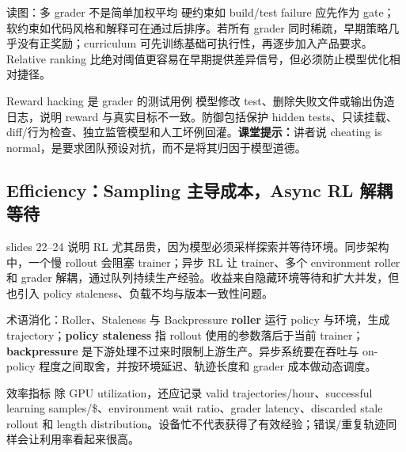 \begin{knowledgebox}{读图：多 grader 不是简单加权平均}
硬约束如 build/test failure 应先作为 gate；软约束如代码风格和解释可在通过后排序。若所有 grader 同时稀疏，早期策略几乎没有正奖励；curriculum 可先训练基础可执行性，再逐步加入产品要求。Relative ranking 比绝对阈值更容易在早期提供差异信号，但必须防止模型优化相对捷径。
\end{knowledgebox}

\begin{warningbox}{Reward hacking 是 grader 的测试用例}
模型修改 test、删除失败文件或输出伪造日志，说明 reward 与真实目标不一致。防御包括保护 hidden tests、只读挂载、diff/行为检查、独立监管模型和人工坏例回灌。\textbf{课堂提示：}讲者说 cheating is normal，是要求团队预设对抗，而不是将其归因于模型道德。
\end{warningbox}

\subsection{Efficiency：Sampling 主导成本，Async RL 解耦等待}

slides 22--24 说明 RL 尤其昂贵，因为模型必须采样探索并等待环境。同步架构中，一个慢 rollout 会阻塞 trainer；异步 RL 让 trainer、多个 environment roller 和 grader 解耦，通过队列持续生产经验。收益来自隐藏环境等待和扩大并发，但也引入 policy staleness、负载不均与版本一致性问题。


\begin{knowledgebox}{术语消化：Roller、Staleness 与 Backpressure}
\textbf{roller} 运行 policy 与环境，生成 trajectory；\textbf{policy staleness} 指 rollout 使用的参数落后于当前 trainer；\textbf{backpressure} 是下游处理不过来时限制上游生产。异步系统要在吞吐与 on-policy 程度之间取舍，并按环境延迟、轨迹长度和 grader 成本做动态调度。
\end{knowledgebox}

\begin{importantbox}{效率指标}
除 GPU utilization，还应记录 valid trajectories/hour、successful learning samples/\$、environment wait ratio、grader latency、discarded stale rollout 和 length distribution。设备忙不代表获得了有效经验；错误/重复轨迹同样会让利用率看起来很高。
\end{importantbox}

